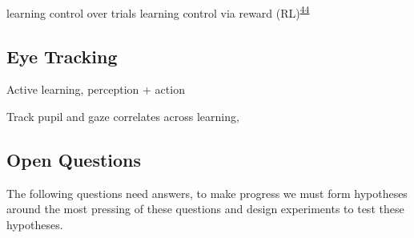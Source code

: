 \documentclass[
  a4paper,
]{article}
\begin{document}
learning control over trials learning control via reward
(RL)\textsuperscript{\protect\hyperlink{ref-vanderkooijLearningReachTrajectory2021}{44}}

\hypertarget{eye-tracking}{%
\subsection{Eye Tracking}\label{eye-tracking}}

Active learning, perception + action

Track pupil and gaze correlates across learning,

\hypertarget{open-questions}{%
\subsection{Open Questions}\label{open-questions}}

The following questions need answers, to make progress we must form
hypotheses around the most pressing of these questions and design
experiments to test these hypotheses.
\end{document}
